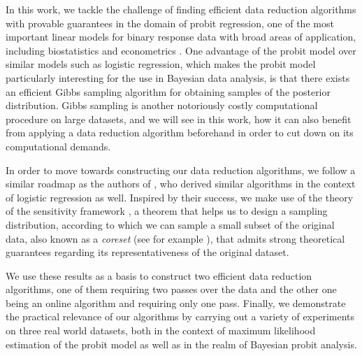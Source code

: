 In this work, we tackle the challenge of finding efficient
data reduction algorithms with provable guarantees
in the domain of probit regression, one of the most important
linear models for binary response data with broad areas of
application, including biostatistics \cite{probit-biostatistics}
and econometrics \cite{probit-econometrics}.
One advantage of the probit model over similar models such
as logistic regression, which makes the probit model particularly
interesting for the use in Bayesian data analysis, is that
there exists an efficient Gibbs sampling algorithm
\cite{gibbs-probit-albert-chib} for obtaining samples of the
posterior distribution. Gibbs sampling is another notoriously
costly computational procedure on large datasets,
and we will see in this work, how it can also benefit from
applying a data reduction algorithm beforehand in order
to cut down on its computational demands.

In order to move towards constructing our data reduction algorithms,
we follow a similar roadmap as the authors
of \cite{on-coresets}, who derived similar algorithms in the
context of logistic regression as well.
Inspired by their success, we make use of the theory of the
sensitivity framework \cite{big-data-tiny-data}, a theorem
that helps us to design a sampling distribution, according
to which we can sample a small subset of the original data,
also known as a \textit{coreset}
(see for example \cite{munteanu-coresets-introduction}),
that admits strong theoretical
guarantees regarding its representativeness of the original
dataset.

We use these results as a basis to construct two efficient
data reduction algorithms, one of them requiring two passes
over the data and the other one being an online
algorithm and requiring only one pass.
Finally, we demonstrate the practical relevance of our algorithms
by carrying out a variety of experiments
on three real world datasets,
both in the context of maximum likelihood estimation of the probit model
as well as in the realm of Bayesian probit analysis.
